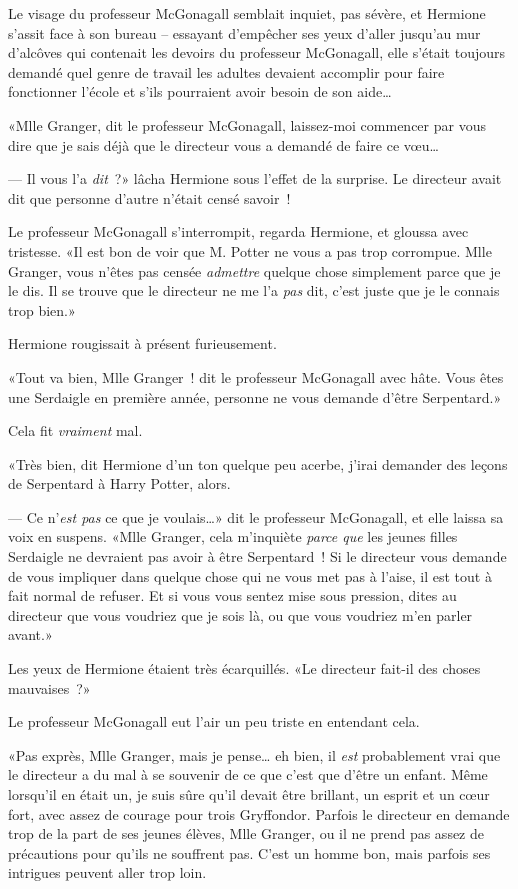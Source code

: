 Le visage du professeur McGonagall semblait inquiet, pas sévère, et Hermione s'assit face à son bureau -- essayant d'empêcher ses yeux d'aller jusqu'au mur d'alcôves qui contenait les devoirs du professeur McGonagall, elle s'était toujours demandé quel genre de travail les adultes devaient accomplir pour faire fonctionner l'école et s'ils pourraient avoir besoin de son aide…

«Mlle Granger, dit le professeur McGonagall, laissez-moi commencer par vous dire que je sais déjà que le directeur vous a demandé de faire ce vœu…

--- Il vous l'a \emph{dit}~?» lâcha Hermione sous l'effet de la surprise. Le directeur avait dit que personne d'autre n'était censé savoir~!

Le professeur McGonagall s'interrompit, regarda Hermione, et gloussa avec tristesse. «Il est bon de voir que M. Potter ne vous a pas trop corrompue. Mlle Granger, vous n'êtes pas censée \emph{admettre} quelque chose simplement parce que je le dis. Il se trouve que le directeur ne me l'a \emph{pas} dit, c'est juste que je le connais trop bien.»

Hermione rougissait à présent furieusement.

«Tout va bien, Mlle Granger~! dit le professeur McGonagall avec hâte. Vous êtes une Serdaigle en première année, personne ne vous demande d'être Serpentard.»

Cela fit \emph{vraiment} mal.

«Très bien, dit Hermione d'un ton quelque peu acerbe, j'irai demander des leçons de Serpentard à Harry Potter, alors.

--- Ce n'\emph{est pas} ce que je voulais…» dit le professeur McGonagall, et elle laissa sa voix en suspens. «Mlle Granger, cela m'inquiète \emph{parce que} les jeunes filles Serdaigle ne devraient pas avoir à être Serpentard~! Si le directeur vous demande de vous impliquer dans quelque chose qui ne vous met pas à l'aise, il est tout à fait normal de refuser. Et si vous vous sentez mise sous pression, dites au directeur que vous voudriez que je sois là, ou que vous voudriez m'en parler avant.»

Les yeux de Hermione étaient très écarquillés. «Le directeur fait-il des choses mauvaises~?»

Le professeur McGonagall eut l'air un peu triste en entendant cela.

«Pas exprès, Mlle Granger, mais je pense… eh bien, il \emph{est} probablement vrai que le directeur a du mal à se souvenir de ce que c'est que d'être un enfant. Même lorsqu'il en était un, je suis sûre qu'il devait être brillant, un esprit et un cœur fort, avec assez de courage pour trois Gryffondor. Parfois le directeur en demande trop de la part de ses jeunes élèves, Mlle Granger, ou il ne prend pas assez de précautions pour qu'ils ne souffrent pas. C'est un homme bon, mais parfois ses intrigues peuvent aller trop loin.

